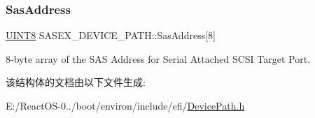 \subsubsection{\texorpdfstring{Sas\+Address}{SasAddress}}
{\footnotesize\ttfamily \hyperlink{_processor_bind_8h_ab27e9918b538ce9d8ca692479b375b6a}{U\+I\+N\+T8} S\+A\+S\+E\+X\+\_\+\+D\+E\+V\+I\+C\+E\+\_\+\+P\+A\+T\+H\+::\+Sas\+Address\mbox{[}8\mbox{]}}

8-\/byte array of the S\+AS Address for Serial Attached S\+C\+SI Target Port. 

该结构体的文档由以下文件生成\+:\begin{DoxyCompactItemize}
\item 
E\+:/\+React\+O\+S-\/0../boot/environ/include/efi/\hyperlink{_device_path_8h}{Device\+Path.\+h}\end{DoxyCompactItemize}
